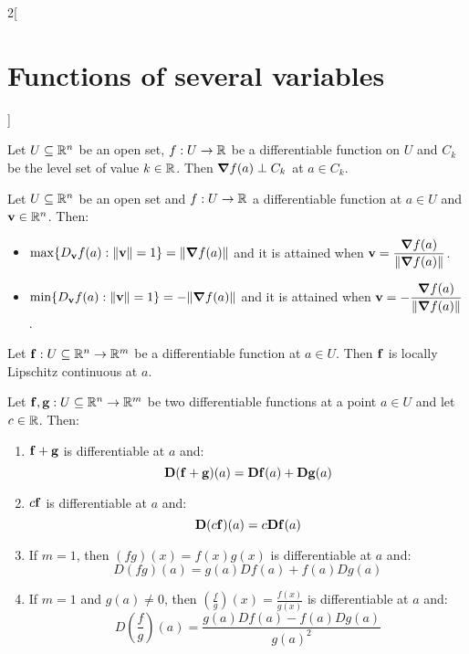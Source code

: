 \documentclass[../../../main.tex]{subfiles}
\begin{document}
\begin{multicols}{2}[\section{Functions of several variables}]
    \begin{prop}
        Let $U\subseteq\mathbb{R}^n$ be an open set, $f:U\rightarrow\mathbb{R} $ be a differentiable function on $U$ and $C_k$ be the level set of value $k\in\mathbb{R} $. Then $\grad f(a)\perp C_k$ at $a\in C_k$.
    \end{prop}
    \begin{prop}
        Let $U\subseteq\mathbb{R}^n$ be an open set and $f:U\rightarrow\mathbb{R} $ a differentiable function at $a\in U$ and $\boldsymbol{\mathrm{v}}\in\mathbb{R}^n$. Then:
        \begin{itemize}
            \item $\displaystyle\max\{D_{\boldsymbol{\mathrm{v}}}f(a):\|\boldsymbol{\mathrm{v}}\|=1\}=\|\grad f(a)\|$ and it is attained when $\displaystyle \boldsymbol{\mathrm{v}}=\frac{\grad f(a)}{\|\grad f(a)\|}$.
            \item $\displaystyle\min\{D_{\boldsymbol{\mathrm{v}}}f(a):\|\boldsymbol{\mathrm{v}}\|=1\}=-\|\grad f(a)\|$ and it is attained when $\displaystyle \boldsymbol{\mathrm{v}}=-\frac{\grad f(a)}{\|\grad f(a)\|}$.
        \end{itemize}
    \end{prop}
    \begin{theorem}
        Let $\boldsymbol{\mathrm{f}}:U\subseteq\mathbb{R}^n\rightarrow\mathbb{R}^m$ be a differentiable function at $a\in U$. Then $\boldsymbol{\mathrm{f}}$ is locally Lipschitz continuous at $a$.
    \end{theorem}
    \begin{theorem}
        Let $\boldsymbol{\mathrm{f}},\boldsymbol{\mathrm{g}}:U\subseteq\mathbb{R}^n\to\mathbb{R}^m$ be two differentiable functions at a point $a\in U$ and let $c\in\mathbb{R} $. Then:
        \begin{enumerate}
            \item $\boldsymbol{\mathrm{f}}+\boldsymbol{\mathrm{g}}$ is differentiable at $a$ and: $$\boldsymbol{\mathrm{D}}(\boldsymbol{\mathrm{f}}+\boldsymbol{\mathrm{g}})(a)=\boldsymbol{\mathrm{Df}}(a)+\boldsymbol{\mathrm{Dg}}(a)$$
            \item $c\boldsymbol{\mathrm{f}}$ is differentiable at $a$ and:
                  $$\boldsymbol{\mathrm{D}}(c\boldsymbol{\mathrm{f}})(a)=c\boldsymbol{\mathrm{Df}}(a)$$
            \item If $m=1$, then $(fg)(x)=f(x)g(x)$ is differentiable at $a$ and: $$D(fg)(a)=g(a)Df(a)+f(a)Dg(a)$$
            \item If $m=1$ and $g(a)\ne0$, then $\displaystyle\left(\frac{f}{g}\right)(x)=\frac{f(x)}{g(x)}$ is differentiable at $a$ and: $$D\left(\frac{f}{g}\right)(a)=\frac{g(a)Df(a)-f(a)Dg(a)}{{g(a)}^2}$$
        \end{enumerate}

\end{theorem}
\end{multicols}
\end{document}

